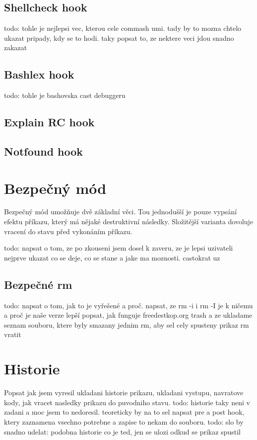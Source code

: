 \documentclass[thesis=M,czech]{FITthesis}[2012/06/26]
\begin{document}
\subsection{Shellcheck hook}
todo: tohle je nejlepsi vec, kterou cele commash umi. tady by to mozna chtelo ukazat pripady, kdy se to hodi. taky popsat to, ze nektere veci jdou snadno zakazat

\subsection{Bashlex hook}
todo: tohle je bashovska cast debuggeru

\subsection{Explain RC hook}

\subsection{Notfound hook}

%
%
%
%
%
\section{Bezpečný mód}
Bezpečný mód umožňuje dvě základní věci. Tou jednodušší je pouze vypsání efektu příkazu, který má nějaké destruktivní následky. Složitější varianta dovoluje vracení do stavu před vykonáním příkazu.

todo: napsat o tom, ze po zkouseni jsem dosel k zaveru, ze je lepsi uzivateli nejprve ukazat co se deje, co se stane a jake ma moznosti. castokrat uz 


\subsection{Bezpečné rm}
todo: napsat o tom, jak to je vyřešené a proč. napsat, ze rm -i i rm -I je k ničemu a proč je naše verze lepší
popsat, jak funguje freedestkop.org trash a ze ukladame seznam souboru, ktere byly smazany jednim rm, aby sel cely spusteny prikaz rm vratit 


\section{Historie}
Popsat jak jsem vyresil ukladani historie prikazu, ukladani vystupu, navratove kody, jak vracet nasledky prikazu do puvodniho stavu.
todo: historie taky neni v zadani a moc jsem to nedoresil. teoreticky by na to sel napsat pre a post hook, ktery zaznamena vsechno potrebne a zapise to nekam do souboru.
todo: slo by snadno udelat: podobna historie co je ted, jen se ulozi odkud se prikaz spustil
\end{document}
